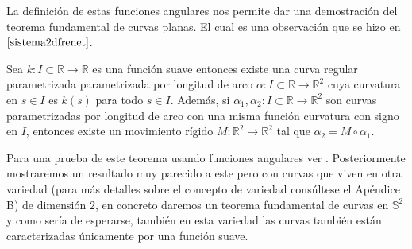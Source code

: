 \documentclass[oneside,11pt]{memoir}
\begin{document}
La definición de estas funciones angulares nos permite dar una demostración del teorema fundamental de curvas planas. El cual es una observación que se hizo en $\ref{sistema2dfrenet}$.
\begin{theorem} Sea $k:I\subset \mathbb{R}\to\mathbb{R}$ es una función suave entonces existe una curva regular parametrizada parametrizada por longitud de arco $\alpha:I\subset \mathbb{R}\to\mathbb{R}^2$ cuya curvatura en $s\in I$ es $k(s)$ para todo $s\in I$. Además, si $\alpha_1,\alpha_2:I\subset \mathbb{R}\to\mathbb{R}^2$ son curvas parametrizadas por longitud de arco con una misma función curvatura con signo en $I$, entonces existe un movimiento rígido $M:\mathbb{R}^2\to\mathbb{R}^2$ tal que $\alpha_2=M\circ \alpha_1$. 
    
\end{theorem}
Para una prueba de este teorema usando funciones angulares ver \cite[p.~13]{montiel2009curves}. Posteriormente mostraremos un resultado muy parecido a este pero con curvas que viven en otra variedad (para más detalles sobre el concepto de variedad consúltese el Apéndice B) de dimensión $2$, en concreto daremos un teorema fundamental de curvas en $\mathbb{S}^2$ y como sería de esperarse, también en esta variedad las curvas también están caracterizadas únicamente por una función suave.
\end{document}
